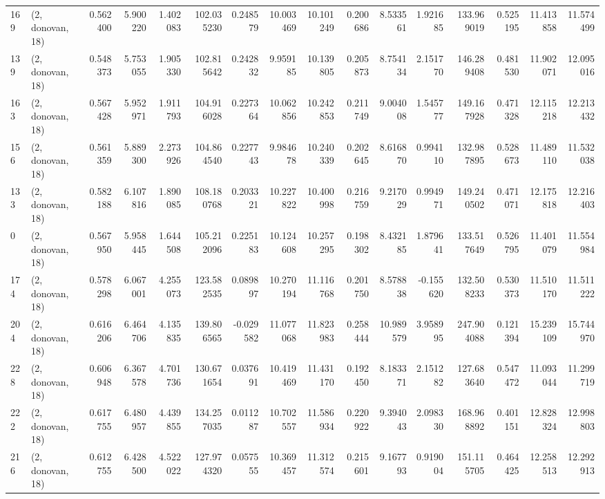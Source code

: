 \begin{tabular}{llrrrrrrrrrrrrrr}
169 &  (2, donovan, 18) &   0.562400 &   5.900220 &   1.402083 &   102.035230 &   0.248579 &  10.003469 &  10.101249 &  0.200686 &   8.533561 &   1.921685 &   133.969019 &  0.525195 &  11.413858 &  11.574499 \\
139 &  (2, donovan, 18) &   0.548373 &   5.753055 &   1.905330 &   102.815642 &   0.242832 &   9.959185 &  10.139805 &  0.205873 &   8.754134 &   2.151770 &   146.289408 &  0.481530 &  11.902071 &  12.095016 \\
163 &  (2, donovan, 18) &   0.567428 &   5.952971 &   1.911793 &   104.916028 &   0.227364 &  10.062856 &  10.242853 &  0.211749 &   9.004008 &   1.545777 &   149.167928 &  0.471328 &  12.115218 &  12.213432 \\
156 &  (2, donovan, 18) &   0.561359 &   5.889300 &   2.273926 &   104.864540 &   0.227743 &   9.984678 &  10.240339 &  0.202645 &   8.616870 &   0.994110 &   132.987895 &  0.528673 &  11.489110 &  11.532038 \\
133 &  (2, donovan, 18) &   0.582188 &   6.107816 &   1.890085 &   108.180768 &   0.203321 &  10.227822 &  10.400998 &  0.216759 &   9.217029 &   0.994971 &   149.240502 &  0.471071 &  12.175818 &  12.216403 \\
0   &  (2, donovan, 18) &   0.567950 &   5.958445 &   1.644508 &   105.212096 &   0.225183 &  10.124608 &  10.257295 &  0.198302 &   8.432185 &   1.879641 &   133.517649 &  0.526795 &  11.401079 &  11.554984 \\
174 &  (2, donovan, 18) &   0.578298 &   6.067001 &   4.255073 &   123.582535 &   0.089897 &  10.270194 &  11.116768 &  0.201750 &   8.578838 &  -0.155620 &   132.508233 &  0.530373 &  11.510170 &  11.511222 \\
204 &  (2, donovan, 18) &   0.616206 &   6.464706 &   4.135835 &   139.806565 &  -0.029582 &  11.077068 &  11.823983 &  0.258444 &  10.989579 &   3.958995 &   247.904088 &  0.121394 &  15.239109 &  15.744970 \\
228 &  (2, donovan, 18) &   0.606948 &   6.367578 &   4.701736 &   130.671654 &   0.037691 &  10.419469 &  11.431170 &  0.192450 &   8.183371 &   2.151282 &   127.683640 &  0.547472 &  11.093044 &  11.299719 \\
222 &  (2, donovan, 18) &   0.617755 &   6.480957 &   4.439855 &   134.257035 &   0.011287 &  10.702557 &  11.586934 &  0.220922 &   9.394043 &   2.098330 &   168.968892 &  0.401151 &  12.828324 &  12.998803 \\
216 &  (2, donovan, 18) &   0.612755 &   6.428500 &   4.522022 &   127.974320 &   0.057555 &  10.369457 &  11.312574 &  0.215601 &   9.167793 &   0.919004 &   151.115705 &  0.464425 &  12.258513 &  12.292913 \\

\end{tabular}
